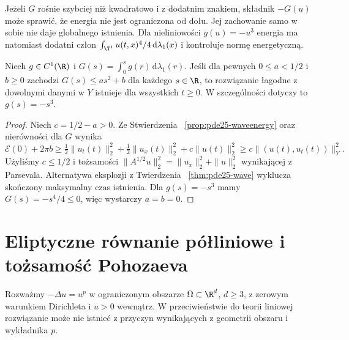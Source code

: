 \begin{uwaga}
Jeżeli $G$ rośnie szybciej niż kwadratowo i z dodatnim
znakiem, składnik $-G(u)$ może sprawić, że energia
nie jest ograniczona od dołu. Jej zachowanie samo w sobie
nie daje globalnego istnienia. Dla nieliniowości
$g(u)=-u^3$ energia ma natomiast dodatni człon
$\int_{\T^1}u(t,x)^4/4\,\mathrm d\lambda_1(x)$
i kontroluje normę energetyczną.
\end{uwaga}

\begin{wniosek}
\label{cor:pde25-wave-global}
Niech $g\in C^1(\R)$ i $G(s)=\int_0^s g(r)\,
\mathrm d\lambda_1(r)$. Jeśli dla pewnych
$0\le a<1/2$ i $b\ge0$ zachodzi
$G(s)\le a s^2+b$ dla każdego $s\in\R$,
to rozwiązanie łagodne z dowolnymi danymi w $Y$
istnieje dla wszystkich $t\ge0$.
W szczególności dotyczy to $g(s)=-s^3$.
\end{wniosek}
\begin{proof}
Niech $c=1/2-a>0$. Ze Stwierdzenia
~\ref{prop:pde25-waveenergy} oraz nierówności
dla $G$ wynika
\[
 \mathcal E(0)+2\pi b
 \ge \tfrac12\|u_t(t)\|_2^2+
 \tfrac12\|u_x(t)\|_2^2+c\|u(t)\|_2^2
 \ge c\|(u(t),u_t(t))\|_Y^2 .
\]
Użyliśmy $c\le1/2$ i tożsamości
$\|A^{1/2}u\|_2^2=\|u_x\|_2^2+\|u\|_2^2$
wynikającej z Parsevala.
Alternatywa eksplozji z Twierdzenia
~\ref{thm:pde25-wave} wyklucza skończony
maksymalny czas istnienia. Dla $g(s)=-s^3$
mamy $G(s)=-s^4/4\le0$, więc wystarczy $a=b=0$.
\end{proof}

\section{Eliptyczne równanie półliniowe i tożsamość Pohozaeva}
Rozważmy $-\Delta u=u^p$ w ograniczonym obszarze
$\Omega\subset\R^d$, $d\ge3$, z zerowym warunkiem
Dirichleta i $u>0$ wewnątrz. W przeciwieństwie do teorii
liniowej rozwiązanie może nie istnieć z przyczyn
wynikających z geometrii obszaru i wykładnika $p$.

